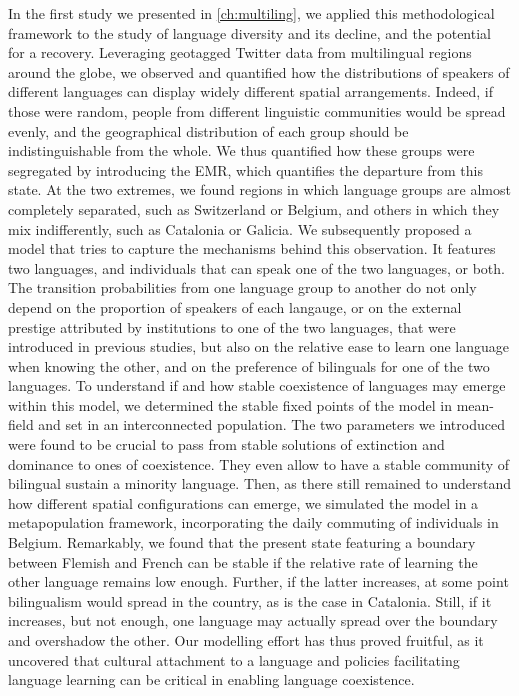 \documentclass[../thesis.tex]{subfiles}
\begin{document}
In the first study we presented in \cref{ch:multiling}, we applied this methodological
framework to the study of language diversity and its decline, and the potential for a
recovery. Leveraging geotagged Twitter data from multilingual regions around the globe,
we observed and quantified how the distributions of speakers of different languages can
display widely different spatial arrangements. Indeed, if those were random, people from
different linguistic communities would be spread evenly, and the geographical
distribution of each group should be indistinguishable from the whole. We thus
quantified how these groups were segregated by introducing the \ac{EMR}, which
quantifies the departure from this state. At the two extremes, we found regions in which
language groups are almost completely separated, such as Switzerland or Belgium, and
others in which they mix indifferently, such as Catalonia or Galicia. We subsequently
proposed a model that tries to capture the mechanisms behind this observation. It
features two languages, and individuals that can speak one of the two languages, or
both. The transition probabilities from one language group to another do not only depend
on the proportion of speakers of each langauge, or on the external prestige attributed
by institutions to one of the two languages, that were introduced in previous studies,
but also on the relative ease to learn one language when knowing the other, and on the
preference of bilinguals for one of the two languages. To understand if and how stable
coexistence of languages may emerge within this model, we determined the stable fixed
points of the model in mean-field and set in an interconnected population. The two
parameters we introduced were found to be crucial to pass from stable solutions of
extinction and dominance to ones of coexistence. They even allow to have a stable
community of bilingual sustain a minority language. Then, as there still remained to
understand how different spatial configurations can emerge, we simulated the model in a
metapopulation framework, incorporating the daily commuting of individuals in Belgium.
Remarkably, we found that the present state featuring a boundary between Flemish and
French can be stable if the relative rate of learning the other language remains low
enough. Further, if the latter increases, at some point bilingualism would spread in the
country, as is the case in Catalonia. Still, if it increases, but not enough, one
language may actually spread over the boundary and overshadow the other. Our modelling
effort has thus proved fruitful, as it uncovered that cultural attachment to a language
and policies facilitating language learning can be critical in enabling language
coexistence.
\end{document}
